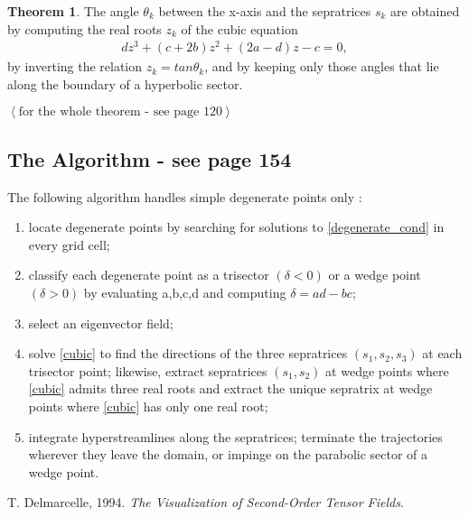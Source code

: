 \documentclass[12pt,twoside,onecolumn]{article}
\theoremstyle{definition}
\newtheorem{thm}{Theorem}
\begin{document}
\begin{thm}
The angle $\theta_k$ between the x-axis and the sepratrices $s_k$ are obtained by computing
the real roots $z_k$ of the cubic equation
\begin{align} \label{cubic}
dz^3 + (c + 2b)z^2 + (2a - d)z - c = 0,
\end{align}
by inverting the relation $z_k = tan \theta_k$, and by keeping only those angles that lie along 
the boundary of a hyperbolic sector.
\end{thm}
$\left<\mbox{for the whole theorem - see page 120}\right>$

\subsection{The Algorithm - see page 154}
The following algorithm handles simple degenerate points only :
\begin{enumerate}
\item locate degenerate points by searching for solutions to \eqref{degenerate_cond} in
every grid cell;
\item  classify each degenerate point as a trisector $(\delta < 0 )$ or a wedge point
$(\delta > 0 )$ by evaluating a,b,c,d and computing $\delta = ad - bc$;
\item select an eigenvector field;
\item solve \eqref{cubic} to find the directions of the three sepratrices $(s_1,s_2,s_3)$ at each
trisector point; likewise, extract sepratrices $(s_1,s_2)$ at wedge points where \eqref{cubic}
admits three real roots and extract the unique sepratrix at wedge points where \eqref{cubic}
has only one real root;
\item integrate hyperstreamlines along the sepratrices; terminate the trajectories wherever
they leave the domain, or impinge on the parabolic sector of a wedge point.
\end{enumerate}


\begin{thebibliography}{9}
	T. Delmarcelle, 1994.
	\emph{The Visualization of Second-Order Tensor Fields}.
\end{thebibliography}
\end{document}
